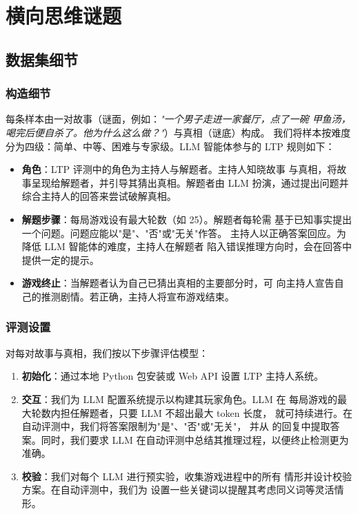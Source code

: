 
\section{横向思维谜题}\label{app:ltp}

\subsection{数据集细节}

\subsubsection*{构造细节}

每条样本由一对故事（谜面，例如：\emph{"一个男子走进一家餐厅，点了一碗
甲鱼汤，喝完后便自杀了。他为什么这么做？"}）与真相（谜底）构成。
我们将样本按难度分为四级：简单、中等、困难与专家级。LLM 智能体参与的
LTP 规则如下：
\begin{itemize}
    \item \textbf{角色}：LTP 评测中的角色为主持人与解题者。主持人知晓故事
          与真相，将故事呈现给解题者，并引导其猜出真相。解题者由 LLM
          扮演，通过提出问题并综合主持人的回答来尝试破解真相。
    \item \textbf{解题步骤}：每局游戏设有最大轮数（如 25）。解题者每轮需
          基于已知事实提出一个问题。问题应能以"是"、"否"或"无关"作答。
          主持人以正确答案回应。为降低 LLM 智能体的难度，主持人在解题者
          陷入错误推理方向时，会在回答中提供一定的提示。
    \item \textbf{游戏终止}：当解题者认为自己已猜出真相的主要部分时，可
          向主持人宣告自己的推测剧情。若正确，主持人将宣布游戏结束。
\end{itemize}

\subsubsection*{评测设置}

对每对故事与真相，我们按以下步骤评估模型：
\begin{enumerate}
    \item \textbf{初始化}：通过本地 Python 包安装或 Web API 设置 LTP
          主持人系统。
    \item \textbf{交互}：我们为 LLM 配置系统提示以构建其玩家角色。LLM 在
          每局游戏的最大轮数内担任解题者，只要 LLM 不超出最大 token 长度，
          就可持续进行。在自动评测中，我们将答案限制为"是"、"否"或"无关"，
          并从  的回复中提取答案。同时，我们要求 LLM
          在自动评测中总结其推理过程，以便终止检测更为准确。
    \item \textbf{校验}：我们对每个 LLM 进行预实验，收集游戏进程中的所有
          情形并设计校验方案。在自动评测中，我们为 
          设置一些关键词以提醒其考虑同义词等灵活情形。
\end{enumerate}

